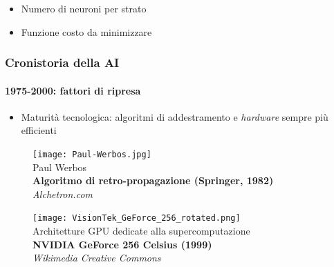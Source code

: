 \begin{frame}[t,fragile]
{{{\begin{minipage}[t]{\textwidth}
\begin{minipage}[t]{.5\textwidth}
\begin{itemize}[leftmargin=10pt,align=right]
\begin{itemize}[leftmargin=20pt,align=right]
								\item[\alert{\faHandORight}] Numero di neuroni per strato
								\item[\alert{\faHandORight}] Funzione costo da minimizzare
							\end{itemize}
					\end{itemize}
				\end{minipage}
		\end{minipage}
		}
	}
}
\end{frame}
%
\begin{frame}[t,fragile] \frametitle{Cronistoria della AI}
	\framesubtitle{1975-2000: fattori di ripresa}
	\vspace*{-.5cm}
	{\small
		\begin{itemize}[leftmargin=10pt,align=right]
			\onslide<1->\item[\alert{\faHandORight}] \alert{Maturità tecnologica:} algoritmi di addestramento e \textit{hardware} sempre più efficienti
		\end{itemize}
		\vfill
		\begin{minipage}[t]{\textwidth}
			\begin{minipage}[b]{0.45\textwidth}
				\centering
				\begin{figure}[ht]
					\centering
					\texttt{[image: Paul-Werbos.jpg]}
					{\tiny\\Paul Werbos\\\textbf{Algoritmo di retro-propagazione (Springer, 1982)}\\\vspace*{-4pt}\textit{\textcopyright Alchetron.com}}
				\end{figure}
			\end{minipage}
			\hfill
			\begin{minipage}[b]{0.45\textwidth}
				\centering
				\begin{figure}[ht]
					\texttt{[image: VisionTek\_GeForce\_256\_rotated.png]}
					{\tiny\\Architetture GPU dedicate alla supercomputazione\\\textbf{NVIDIA GeForce 256 Celsius (1999)}\\\vspace*{-4pt}\textit{\textcopyright Wikimedia Creative Commons}}
				\end{figure}
			\end{minipage}
		\end{minipage}
	}
\end{frame}
